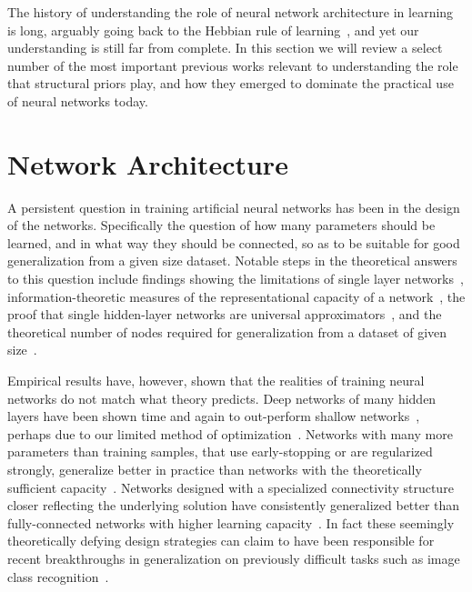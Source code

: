 \documentclass[thesis]{subfiles}
\begin{document}
	
	The history of understanding the role of neural network architecture in learning is long, arguably going back to the Hebbian rule of learning~\citep{hebb1949organization}, and yet our understanding is still far from complete. In this section we will review a select number of the most important previous works relevant to understanding the role that structural priors play, and how they emerged to dominate the practical use of neural networks today.
	
	\section{Network Architecture}
    A persistent question in training artificial neural networks has been in the design of the networks. Specifically the question of how many parameters should be learned, and in what way they should be connected,  so as to be suitable for good generalization from a given size dataset. Notable steps in the theoretical answers to this question include findings showing the limitations of single layer networks~\citep{minsky1988perceptrons}, information-theoretic measures of the representational capacity of a network~\citep{vapnik2015uniform}, the proof that single hidden-layer networks are universal approximators~\citep{hornik89a}, and the theoretical number of nodes required for generalization from a dataset of given size~\citep{baum1989size}. 
    
    Empirical results have, however, shown that the realities of training neural networks do not match what theory predicts. Deep networks of many hidden layers have been shown time and again to out-perform shallow networks~\citep{Krizhevsky2012,Simonyan2014verydeep,He2015,He2016}, perhaps due to our limited method of optimization~\citep{NIPS2014_5484}. Networks with many more parameters than training samples, that use early-stopping or are regularized strongly, generalize better in practice than networks with the theoretically sufficient capacity~\citep{caruana2001overfitting, Krizhevsky2012, HintonTalk2015}. Networks designed with a specialized connectivity structure closer reflecting the underlying solution have consistently generalized better than fully-connected networks with higher learning capacity~\citep{lecun1989backpropagation,He2016}. In fact these seemingly theoretically defying design strategies can claim to have been responsible for recent breakthroughs in generalization on previously difficult tasks such as image class recognition~\citep{Krizhevsky2012, HintonTalk2015}.
    
\end{document}
